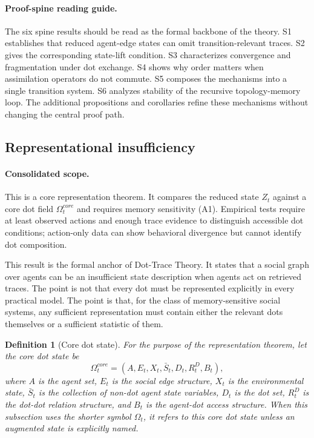 \documentclass[11pt]{article}
\newtheorem{definition}{Definition}
\theoremstyle{remark}
\begin{document}
\paragraph{Proof-spine reading guide.} The six spine results should be read as the formal backbone of the theory. S1 establishes that reduced agent-edge states can omit transition-relevant traces. S2 gives the corresponding state-lift condition. S3 characterizes convergence and fragmentation under dot exchange. S4 shows why order matters when assimilation operators do not commute. S5 composes the mechanisms into a single transition system. S6 analyzes stability of the recursive topology-memory loop. The additional propositions and corollaries refine these mechanisms without changing the central proof path.

\subsection{Representational insufficiency}\label{representational-insufficiency}

\paragraph{Consolidated scope.} This is a core representation theorem. It compares the reduced state $Z_t$ against a core dot field $\Omega_t^{core}$ and requires memory sensitivity (A1). Empirical tests require at least observed actions and enough trace evidence to distinguish accessible dot conditions; action-only data can show behavioral divergence but cannot identify dot composition.

This result is the formal anchor of Dot-Trace Theory. It states that a
social graph over agents can be an insufficient state description when
agents act on retrieved traces. The point is not that every dot must be
represented explicitly in every practical model. The point is that, for
the class of memory-sensitive social systems, any sufficient
representation must contain either the relevant dots themselves or a
sufficient statistic of them.

\begin{definition}[Core dot state]
For the purpose of the representation theorem, let the core dot state be
$$
\Omega_t^{core}=(A,E_t,X_t,\bar S_t,D_t,R_t^D,B_t),
$$
where $A$ is the agent set, $E_t$ is the social edge structure, $X_t$ is the environmental state, $\bar S_t$ is the collection of non-dot agent state variables, $D_t$ is the dot set, $R_t^D$ is the dot-dot relation structure, and $B_t$ is the agent-dot access structure. When this subsection uses the shorter symbol $\Omega_t$, it refers to this core dot state unless an augmented state is explicitly named.
\end{definition}
\end{document}
